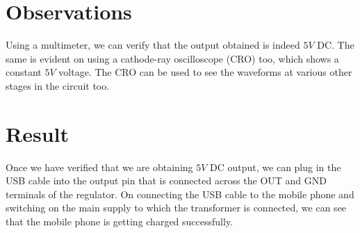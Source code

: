 \documentclass[journal,12pt,twocolumn]{IEEEtran}
\begin{document}
	\section{Observations}
	Using a multimeter, we can verify that the output obtained is indeed $5 V$ DC. The same is evident on using a cathode-ray oscilloscope (CRO) too, which shows a constant $5 V$ voltage. The CRO can be used to see the waveforms at various other stages in the circuit too.
	
	\section{Result}	
	Once we have verified that we are obtaining $5 V$ DC output, we can plug in the USB cable into the output pin that is connected across the OUT and GND terminals of the regulator. On connecting the USB cable to the mobile phone and switching on the main supply to which the transformer is connected, we can see that the mobile phone is getting charged successfully.
	
	
\end{document}
